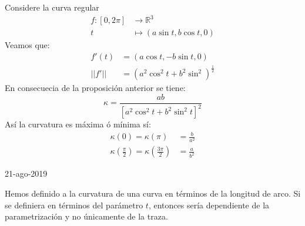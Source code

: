         \begin{example}
          Considere la curva regular 
          \begin{align*}
            f:[0,2 \pi] &\to \mathbb{R}^3 \\
            t &\mapsto (a\sin t, b \cos t, 0)
          \end{align*}
          Veamos que:
          \begin{align*}
            f'(t) &= (a \cos t, - b \sin t, 0) \\
            ||f'|| &= (a^2 \cos^2 t + b^2 \sin^2)^{\frac{1}{2}}
          \end{align*}
          En consecuecia de la proposición anterior se tiene:
          \[
            \kappa = \frac{ab}{[a^2 \cos^2 t + b^2 \sin^2 t]^2}
          \]
          Así la curvatura es máxima ó mínima sí:
          \begin{align*}
            \kappa(0) = \kappa(\pi) &= \frac{b}{a^2} \\ 
            \kappa(\frac{\pi}{2}) = \kappa(\frac{3\pi}{2}) &= \frac{a}{b^2}
          \end{align*}
        \end{example}
21-ago-2019

Hemos definido a la curvatura de una curva en términos de la longitud de arco.
Si se definiera en términos del parámetro $t$, entonces sería dependiente de la
parametrización y no únicamente de la traza. \\ 

